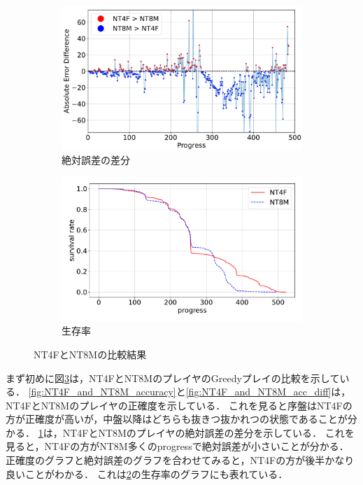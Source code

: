 \begin{figure}[t]
\begin{subfigure}[b]{0.49\linewidth}
    \includegraphics[width=\linewidth]{pdf/compare/NT4F_and_NT8M/error_abs_diff_plot.pdf}
    \caption{絶対誤差の差分}
    \label{fig:NT4F_and_NT8M_error_abs_diff}
\end{subfigure}
\begin{subfigure}[b]{0.49\linewidth}
    \includegraphics[width=\linewidth]{pdf/compare/NT4F_and_NT8M/survival.pdf}
    \caption{生存率}
    \label{fig:NT4F_and_NT8M_survival}
\end{subfigure}
\caption{NT4FとNT8Mの比較結果}
\label{fig:NT4F_and_NT8M_results}
\end{figure}

まず初めに図\ref{fig:NT4F_and_NT8M_results}は，NT4FとNT8MのプレイヤのGreedyプレイの比較を示している．
\ref{fig:NT4F_and_NT8M_accuracy}と\ref{fig:NT4F_and_NT8M_acc_diff}は，NT4FとNT8Mのプレイヤの正確度を示している．
これを見ると序盤はNT4Fの方が正確度が高いが，中盤以降はどちらも抜きつ抜かれつの状態であることが分かる．
\ref{fig:NT4F_and_NT8M_error_abs_diff}は，NT4FとNT8Mのプレイヤの絶対誤差の差分を示している．
これを見ると，NT4Fの方がNT8M多くのprogressで絶対誤差が小さいことが分かる．
正確度のグラフと絶対誤差のグラフを合わせてみると，NT4Fの方が後半かなり良いことがわかる．
これは\ref{fig:NT4F_and_NT8M_survival}の生存率のグラフにも表れている．

